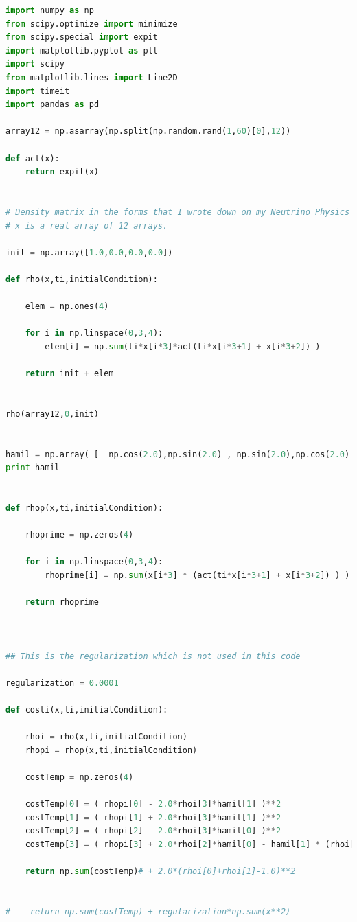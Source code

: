 \documentclass{tufte-handout}
\begin{document}
\begin{lstlisting}[language=Python]
import numpy as np
from scipy.optimize import minimize
from scipy.special import expit
import matplotlib.pyplot as plt
import scipy
from matplotlib.lines import Line2D
import timeit
import pandas as pd

array12 = np.asarray(np.split(np.random.rand(1,60)[0],12))

def act(x):
    return expit(x)


# Density matrix in the forms that I wrote down on my Neutrino Physics notebook
# x is a real array of 12 arrays.

init = np.array([1.0,0.0,0.0,0.0])

def rho(x,ti,initialCondition):

    elem = np.ones(4)

    for i in np.linspace(0,3,4):
        elem[i] = np.sum(ti*x[i*3]*act(ti*x[i*3+1] + x[i*3+2]) )

    return init + elem


rho(array12,0,init)


hamil = np.array( [  np.cos(2.0),np.sin(2.0) , np.sin(2.0),np.cos(2.0) ] )
print hamil


def rhop(x,ti,initialCondition):

    rhoprime = np.zeros(4)

    for i in np.linspace(0,3,4):
        rhoprime[i] = np.sum(x[i*3] * (act(ti*x[i*3+1] + x[i*3+2]) ) ) +  np.sum( ti*x[i*3]* (act(ti*x[i*3+1] + x[i*3+2]) ) * (1.0 - (act(ti*x[i*3+1] + x[i*3+2])  ) )* x[i*3+1]  )

    return rhoprime



## This is the regularization which is not used in this code

regularization = 0.0001

def costi(x,ti,initialCondition):

    rhoi = rho(x,ti,initialCondition)
    rhopi = rhop(x,ti,initialCondition)

    costTemp = np.zeros(4)

    costTemp[0] = ( rhopi[0] - 2.0*rhoi[3]*hamil[1] )**2
    costTemp[1] = ( rhopi[1] + 2.0*rhoi[3]*hamil[1] )**2
    costTemp[2] = ( rhopi[2] - 2.0*rhoi[3]*hamil[0] )**2
    costTemp[3] = ( rhopi[3] + 2.0*rhoi[2]*hamil[0] - hamil[1] * (rhoi[1] - rhoi[0] ) )**2

    return np.sum(costTemp)# + 2.0*(rhoi[0]+rhoi[1]-1.0)**2


#    return np.sum(costTemp) + regularization*np.sum(x**2)



\end{lstlisting}
\end{document}

